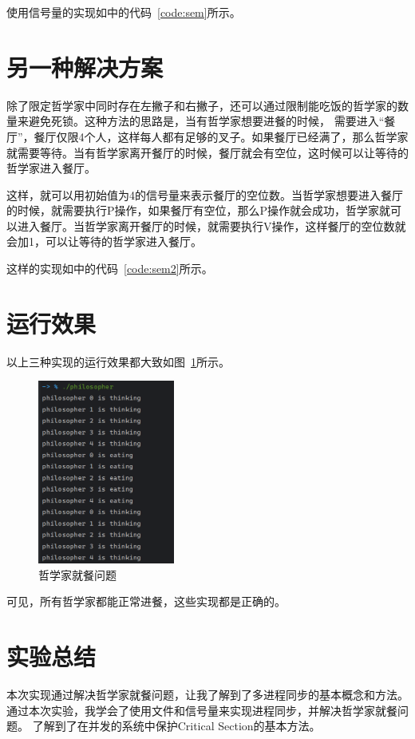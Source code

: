 \documentclass[a4paper,twoside]{article}
\begin{document}
\begin{spacing}{1.2}
使用信号量的实现如中的代码~\ref{code:sem}所示。

\section{另一种解决方案}

除了限定哲学家中同时存在左撇子和右撇子，还可以通过限制能吃饭的哲学家的数量来避免死锁\cite{stallings2012operating}。这种方法的思路是，当有哲学家想要进餐的时候，
需要进入“餐厅”，餐厅仅限4个人，这样每人都有足够的叉子。如果餐厅已经满了，那么哲学家就需要等待。当有哲学家离开餐厅的时候，餐厅就会有空位，这时候可以让等待的哲学家进入餐厅。

这样，就可以用初始值为4的信号量来表示餐厅的空位数。当哲学家想要进入餐厅的时候，就需要执行P操作，如果餐厅有空位，那么P操作就会成功，哲学家就可以进入餐厅。当哲学家离开餐厅的时候，就需要执行V操作，这样餐厅的空位数就会加1，可以让等待的哲学家进入餐厅。

这样的实现如中的代码~\ref{code:sem2}所示。

\section{运行效果}

以上三种实现的运行效果都大致如图~\ref{fig:res}所示。
\begin{figure}[h]
	\centering
	\caption{哲学家就餐问题}
	\label{fig:res}
	\includegraphics[width=0.4\textwidth]{res.png}
\end{figure}
可见，所有哲学家都能正常进餐，这些实现都是正确的。

\section{实验总结}

本次实现通过解决哲学家就餐问题，让我了解到了多进程同步的基本概念和方法。
通过本次实验，我学会了使用文件和信号量来实现进程同步，并解决哲学家就餐问题。
了解到了在并发的系统中保护Critical Section的基本方法。


\end{spacing}
\end{document}
